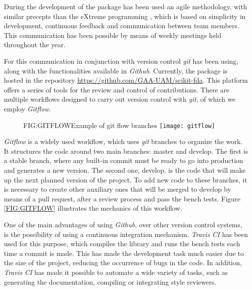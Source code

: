 During the development of the package has been used an agile methodology, with
similar precepts than the eXtreme programming \cite{eXtreme}, which is based on
simplicity in development, continuous feedback and communication between
team members. This communication has been possible by means of weekly meetings held throughout the year.

For this communication in conjunction with version control \textit{git} has been using,
along with the functionalities available in \textit{Github}. 
Currently, the package is hosted in the repository \href{https://github.com/GAA-UAM/scikit-fda}{https://github.com/GAA-UAM/scikit-fda}.
 This platform offers a
series of tools for the review and control of contributions. There are multiple
workflows designed to carry out version control with \textit{git}, of which we employ
\textit{Gitflow}.


\begin{figure}[Example of git flow branches]{FIG:GITFLOW}{Example of git flow branches \footnotemark}
	\texttt{[image: gitflow]}
\end{figure}

\textit{Gitflow} is a widely used workflow, which uses \textit{git} branches to organize the work.
It structures the code around two main branches: master and develop. The first
is a stable branch, where any built-in commit must be ready to go into
production and generates a new version. The second one, develop, is the code
that will make up the next planned version of the project. To add new code to
these branches, it is necessary to create other auxiliary ones that will be
merged to develop by means of a pull request, after a review process and pass
the bench tests. Figure \ref{FIG:GITFLOW} illustrates the mechanics of this
workflow.



One of the main advantages of using \textit{Github}, over other version control systems,
is the possibility of using a continuous integration mechanism. \textit{Travis CI} has
been used for this purpose, 
which compiles the library and runs the bench tests
each time a commit is made. This has made the development task much easier due to the size of the project, reducing the occurrence of bugs in the code.
In addition, \textit{Travis CI} has made it possible to automate a wide variety of tasks, such as generating the
documentation, compiling or integrating style reviewers.

